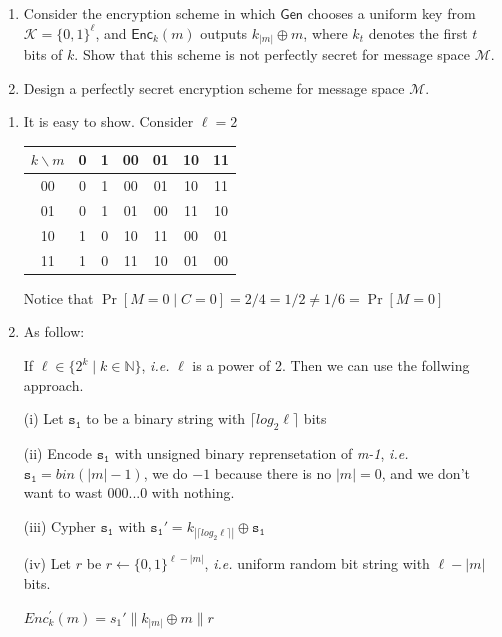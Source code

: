 \begin{enumerate}
	\item[(a)] Consider the encryption scheme in which $\textsf{Gen}$ chooses a uniform key from $\mathcal{K} = \{0,1\}^{\ell}$, and $\textsf{Enc}_k(m)$ outputs $k_{|m|} \oplus m$, where $k_t$ denotes the first $t$ bits of $k$. Show that this scheme is not perfectly secret for message space $\mathcal{M}$.
	
	\item[(b)] Design a perfectly secret encryption scheme for message space $\mathcal{M}$.
\end{enumerate}


\begin{enumerate}
	\item[(a)] It is easy to show. Consider $\ell = 2$
	
		\begin{tabular}{c|cccccc}
		$k \backslash m$ & 0 & 1 & 00 & 01 & 10 & 11 \\
		\hline
		00 & 0 & 1 & 00 & 01 & 10 & 11 \\
		01 & 0 & 1 & 01 & 00 & 11 & 10 \\
		10 & 1 & 0 & 10 & 11 & 00 & 01 \\
		11 & 1 & 0 & 11 & 10 & 01 & 00 \\
	    \end{tabular}
	    
	    Notice that $\Pr[M = 0 \mid C = 0] = 2 / 4 = 1 / 2  \ne 1 / 6 = \Pr[M = 0] $
	
	\item[(b)] As follow:
	
	If $\ell \in \{2^k \mid k \in \mathbb{N}\}$, \textit{i.e.} $\ell$ is a power of 2. Then we can use the follwing approach.
	
	(i) Let $\mathtt{s_1}$ to be a binary string with $\lceil log_2 \ell \rceil$ bits
	
	(ii) Encode $\mathtt{s_1}$ with unsigned binary reprensetation of \textit{m-1}, \textit{i.e.} $\mathtt{s_1} = \textit{bin}(|m|-1)$, we do $- 1$ because there is no $|m| = 0$, and we don't want to wast $000...0$ with nothing.
    
    (iii) Cypher $\mathtt{s_1}$ with $\mathtt{s_1}' =  k_{|\lceil log_2 \ell \rceil|} \oplus \mathtt{s_1}$
	
	(iv) Let $r$ be $r \leftarrow \{0, 1\}^{\ell - |m|}$, \textit{i.e.} uniform random bit string with $\ell - |m|$ bits.
	
	$Enc^{'}_k(m) = s_1' \| k_{|m|} \oplus m \| r$
	

\end{enumerate}

